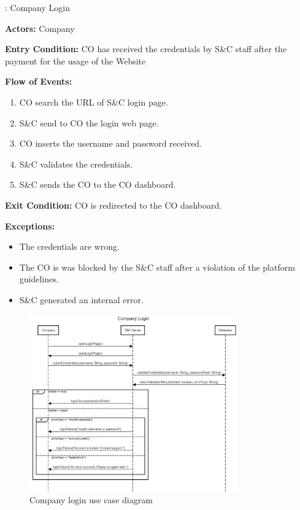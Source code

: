 \nextUseCaseID: Company Login

\par \textbf{Actors:} Company
\par \textbf{Entry Condition:} CO has received the credentials by S\&C staff after the payment for the usage of the Website

\par \textbf{Flow of Events:}

\begin{enumerate}
    \item CO search the URL of S\&C login page.
    \item S\&C send to CO the login web page.
    \item CO inserts the username and password received.
    \item S\&C validates the credentials.
    \item S\&C sends the CO to the CO dashboard.
\end{enumerate}

\par \textbf{Exit Condition:} CO is redirected to the CO dashboard.

\par \textbf{Exceptions:}  
\begin{itemize}
    \item The credentials are wrong.
    \item The CO is was blocked by the S\&C staff after a violation of the platform guidelines.
    \item S\&C generated an internal error.
\end{itemize}

\begin{figure}[H]
    \centering
    \includegraphics[width=0.8\textwidth]{Images/UC_8.pdf}
    \caption{Company login use case diagram}
    \label{fig:use-case-diagram-8}
\end{figure}

